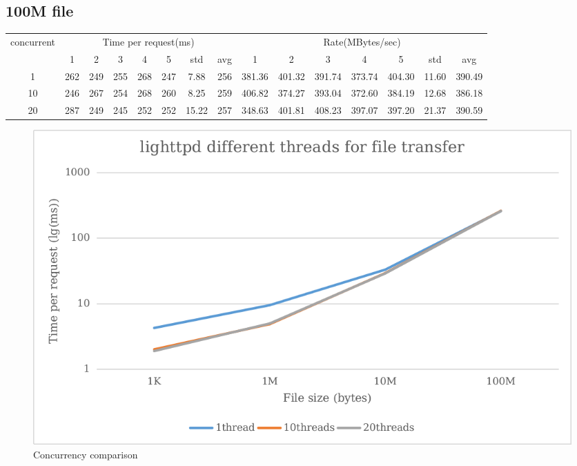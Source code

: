 \documentclass{article}
\begin{document}
\subsection*{100M file}
\begin{table}[H]
    \begin{tabular}{|c|c|c|c|c|c|c|c|c|c|c|c|c|c|c|}
        \hline
        \multirow{2}{*}{concurrent} & \multicolumn{7}{c|}{Time per request(ms)} & \multicolumn{7}{c|}{Rate(MBytes/sec)}                                                                                               \\ \cline{2-15}
                                    & 1                                         & 2                                     & 3   & 4   & 5   & std   & avg & 1      & 2      & 3      & 4      & 5      & std   & avg    \\ \hline
        1                           & 262                                       & 249                                   & 255 & 268 & 247 & 7.88  & 256 & 381.36 & 401.32 & 391.74 & 373.74 & 404.30 & 11.60 & 390.49 \\ \hline
        10                          & 246                                       & 267                                   & 254 & 268 & 260 & 8.25  & 259 & 406.82 & 374.27 & 393.04 & 372.60 & 384.19 & 12.68 & 386.18 \\ \hline
        20                          & 287                                       & 249                                   & 245 & 252 & 252 & 15.22 & 257 & 348.63 & 401.81 & 408.23 & 397.07 & 397.20 & 21.37 & 390.59 \\ \hline
    \end{tabular}
\end{table}
\begin{figure}[H]
    \centering
    \includegraphics[scale=0.6]{pic/p1.png}
    \caption{Concurrency comparison}
\end{figure}
\end{document}
